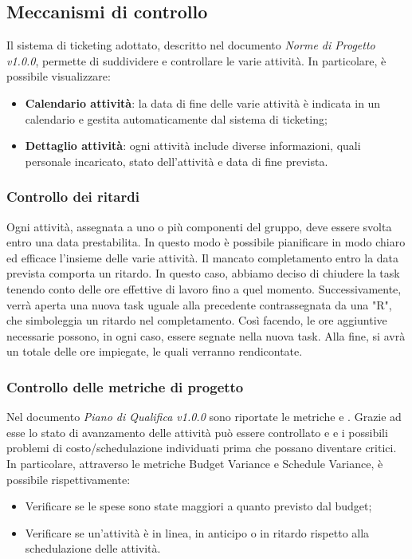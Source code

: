 \subsection{Meccanismi di controllo}
Il sistema di ticketing adottato, descritto nel documento \emph{Norme di Progetto v1.0.0}, permette di suddividere e controllare le varie attività. In particolare, è possibile visualizzare:
\begin{itemize}
\item{\textbf{Calendario attività}}: la data di fine delle varie attività è indicata in un calendario e gestita automaticamente dal sistema di ticketing;  
\item{\textbf{Dettaglio attività}}: ogni attività include diverse informazioni, quali personale incaricato, stato dell'attività e data di fine prevista. 
\end{itemize}
\subsubsection{Controllo dei ritardi}
Ogni attività, assegnata a uno o più componenti del gruppo, deve essere svolta entro una data prestabilita. In questo modo è possibile pianificare in modo chiaro ed efficace l'insieme delle varie attività. Il mancato completamento entro la data prevista comporta un ritardo. In questo caso, abbiamo deciso di chiudere la task tenendo conto delle ore effettive di lavoro fino a quel momento. Successivamente, verrà aperta una nuova task uguale alla precedente contrassegnata da una "R", che simboleggia un ritardo nel completamento. Così facendo, le ore aggiuntive necessarie possono, in ogni caso, essere segnate nella nuova task. Alla fine, si avrà un totale delle ore impiegate, le quali verranno rendicontate.

\subsubsection{Controllo delle metriche di progetto}
Nel documento \emph{Piano di Qualifica v1.0.0} sono riportate le metriche  e . Grazie ad esse lo stato di avanzamento delle attività può essere controllato e  e i possibili problemi di costo/schedulazione individuati prima che possano diventare critici. In particolare, attraverso le metriche Budget Variance e Schedule Variance, è possibile rispettivamente:
\begin{itemize}
\item{Verificare se le spese sono state maggiori a quanto previsto dal budget;}
\item{Verificare se un'attività è in linea, in anticipo o in ritardo rispetto alla schedulazione delle attività.}
\end{itemize}

